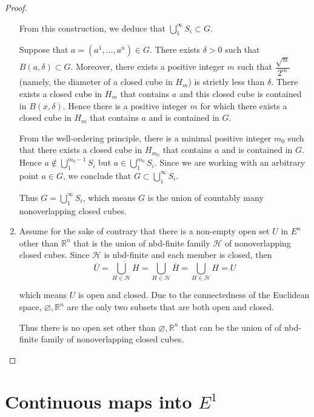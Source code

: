 \begin{proof}
\begin{enumerate}[label={(\alph*)}]
		      From this construction, we deduce that \( \bigcup^{\infty}_{1} S_{i} \subset G \).

		      Suppose that \( a = (a^{1}, \ldots, a^{n}) \in G \). There exists \( \delta > 0 \) such that \( B(a, \delta) \subset G \). Moreover, there exists a positive integer \(m\) such that \( \dfrac{\sqrt{n}}{2^{m}} \) (namely, the diameter of a closed cube in \(H_{m}\)) is strictly less than \( \delta \). There exists a closed cube in \(H_{m}\) that contains \( a \) and this closed cube is contained in \( B(x, \delta) \). Hence there is a positive integer \( m \) for which there exists a closed cube in \( H_{m} \) that contains \( a \) and is contained in \( G \).

		      From the well-ordering principle, there is a minimal positive integer \( m_{0} \) such that there exists a closed cube in \( H_{m_{0}} \) that contains \( a \) and is contained in \( G \). Hence \( a \notin \bigcup^{m_{0} - 1}_{1} S_{i} \) but \( a \in \bigcup^{m_{0}}_{1} S_{i} \). Since we are working with an arbitrary point \( a \in G \), we conclude that \( G \subset \bigcup^{\infty}_{1} S_{i} \).

		      Thus \( G = \bigcup^{\infty}_{1} S_{i} \), which means \( G \) is the union of countably many nonoverlapping closed cubes.
		\item Assume for the sake of contrary that there is a non-empty open set \( U \) in \( E^{n} \) other than \( \mathbb{R}^{n} \) that is the union of nbd-finite family \( \mathscr{H} \) of nonoverlapping closed cubes. Since \( \mathscr{H} \) is nbd-finite and each member is closed, then
		      \[
			      \overline{U} = \overline{\bigcup_{H \in \mathscr{H}} H} = \bigcup_{H \in \mathscr{H}} \overline{H} = \bigcup_{H \in \mathscr{H}} H = U
		      \]

		      which means \( U \) is open and closed. Due to the connectedness of the Euclidean space, \( \varnothing, \mathbb{R}^{n} \) are the only two subsets that are both open and closed.

		      Thus there is no open set other than \( \varnothing, \mathbb{R}^{n} \) that can be the union of of nbd-finite family of nonoverlapping closed cubes.
	\end{enumerate}
\end{proof}

\section{Continuous maps into \( E^{1} \)}

